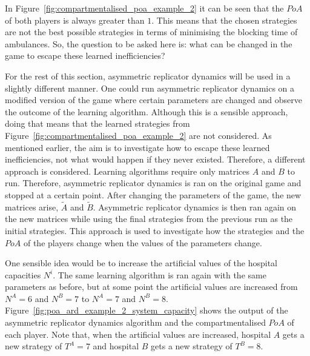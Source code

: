 In Figure~\ref{fig:compartmentalised_poa_example_2} it can be seen that the
\(PoA\) of both players is always greater than \(1\).
This means that the chosen strategies are not the best possible strategies in
terms of minimising the blocking time of ambulances.
So, the question to be asked here is: what can be changed in the game to escape
these learned inefficiencies?

For the rest of this section, asymmetric replicator dynamics will be used in
a slightly different manner.
One could run asymmetric replicator dynamics on a modified version of the game
where certain parameters are changed and observe the outcome of the learning
algorithm.
Although this is a sensible approach, doing that means that the learned
strategies from Figure~\ref{fig:compartmentalised_poa_example_2} are not
considered.
As mentioned earlier, the aim is to investigate how to escape these learned
inefficiencies, not what would happen if they never existed.
Therefore, a different approach is considered.
Learning algorithms require only matrices \(A\) and \(B\) to run.
Therefore, asymmetric replicator dynamics is ran on the original game and
stopped at a certain point.
After changing the parameters of the game, the new matrices arise, \(\tilde{A}\)
and \(\tilde{B}\).
Asymmetric replicator dynamics is then ran again on the new matrices while
using the final strategies from the previous run as the initial strategies.
This approach is used to investigate how the strategies and the \(PoA\) of
the players change when the values of the parameters change.

One sensible idea would be to increase the artificial values of the hospital
capacities \(N^i\).
The same learning algorithm is ran again with the same parameters as before, but
at some point the artificial values are increased from \(N^A = 6\) and
\(N^B = 7\) to \(N^A = 7\) and \(N^B = 8\).
Figure~\ref{fig:poa_ard_example_2_system_capacity} shows the output of the
asymmetric replicator dynamics algorithm and the compartmentalised \(PoA\) of
each player.
Note that, when the artificial values are increased, hospital \(A\) gets a new
strategy of \(T^A = 7\) and hospital \(B\) gets a new strategy of \(T^B = 8\). 

